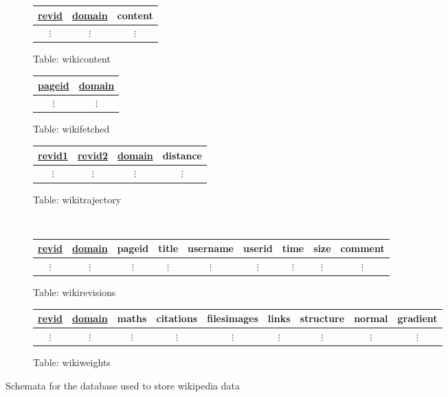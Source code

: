 \begin{figure}
  \label{database-schema}
  \centering
  \begin{subfigure}[b!]{0.3\linewidth}
    \centering
    \begin{tabular}{ccc}
      \toprule
      \underline{revid} & \underline{domain} & content\\
      \midrule
      $\vdots$ & $\vdots$ & $\vdots$\\
    \end{tabular}
    \caption{Table: wikicontent}
  \end{subfigure}
  \begin{subfigure}[b!]{0.3\linewidth}
    \centering
    \begin{tabular}{cc}
      \toprule
      \underline{pageid} & \underline{domain} \\
      \midrule
      $\vdots$ & $\vdots$\\
    \end{tabular}
    \caption{Table: wikifetched}
  \end{subfigure}
  \begin{subfigure}[b!]{0.3\linewidth}
    \centering
    \begin{tabular}{cccc}
      \toprule
      \underline{revid1} & \underline{revid2} & \underline{domain} & distance\\
      \midrule
      $\vdots$ & $\vdots$ & $\vdots$ & $\vdots$ \\
    \end{tabular}
    \caption{Table: wikitrajectory}
  \end{subfigure}\\
  \vspace{10 mm}
  \begin{subfigure}[b!]{\linewidth}
    \centering
    \begin{tabular}{ccccccccc}
      \toprule
      \underline{revid} & \underline{domain} & pageid & title & username & userid & time & size &
      comment \\ 
      \midrule
      $\vdots$ & $\vdots$ & $\vdots$ & $\vdots$ & $\vdots$ & $\vdots$ & $\vdots$
      & $\vdots$ & $\vdots$ \\
    \end{tabular}
    \caption{Table: wikirevisions}
  \end{subfigure}

  \begin{subfigure}[b!]{\linewidth}
    \centering
    \begin{tabular}{ccccccccc}
      \toprule
      \underline{revid} & \underline{domain} & maths & citations & filesimages & links &
      structure & normal & gradient\\
      \midrule
      $\vdots$ & $\vdots$ & $\vdots$ & $\vdots$ & $\vdots$ & $\vdots$ &
      $\vdots$ & $\vdots$ & $\vdots$ \\
    \end{tabular}
    \caption{Table: wikiweights} 
  \end{subfigure}
  \caption{Schemata for the database used to store wikipedia data}
\end{figure}

